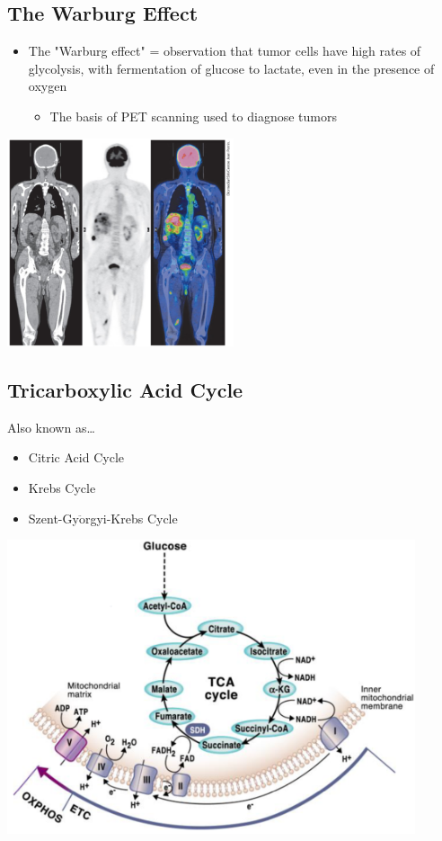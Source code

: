 \documentclass[10pt]{article}
\begin{document}
\subsection*{The Warburg Effect}
\begin{itemize}
	\item The "Warburg effect" = observation that tumor cells have high rates of glycolysis, with fermentation of glucose to lactate, even in the presence of oxygen
	\begin{itemize}
        \item The basis of PET scanning used to diagnose tumors
    \end{itemize}
\end{itemize}
\begin{center} 
	\includegraphics*[width=0.5\textwidth]{L2_18.png}
\end{center}

\subsection*{Tricarboxylic Acid Cycle}
Also known as\dots
\begin{itemize}
	\item Citric Acid Cycle
	\item Krebs Cycle
	\item Szent-Gy$\ddot{\text{o}}$rgyi-Krebs Cycle
\end{itemize}
\begin{center} 
	\includegraphics*[width=0.9\textwidth]{L2_19.png}
\end{center}
\end{document}
